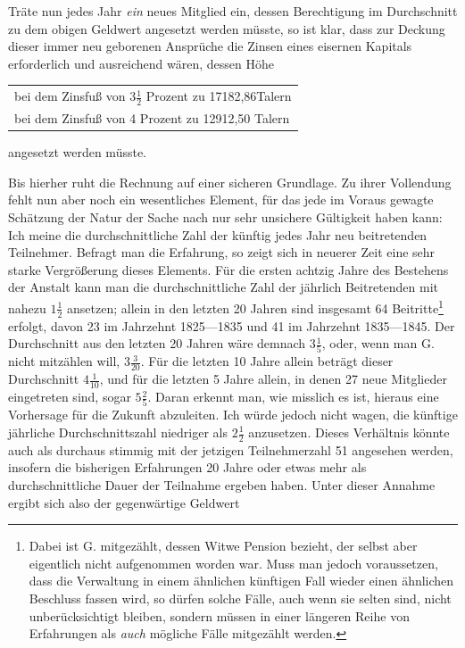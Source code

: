 Träte nun jedes Jahr \textit{ein} neues Mitglied ein, dessen Berechtigung im Durchschnitt zu dem obigen Geldwert angesetzt werden müsste, so ist klar, dass zur Deckung dieser immer neu geborenen Ansprüche die Zinsen eines eisernen Kapitals erforderlich und ausreichend wären, dessen Höhe
\begin{center}
\begin{tabular}{l}
bei dem Zinsfuß von \(3\tfrac{1}{2}\) Prozent zu 17182,86Talern\\
bei dem Zinsfuß von 4 Prozent zu 12912,50 Talern
\end{tabular}
\end{center}
\noindent angesetzt werden müsste.

Bis hierher ruht die Rechnung auf einer sicheren Grundlage. Zu ihrer Vollendung fehlt nun aber noch ein wesentliches Element, für das jede im Voraus gewagte Schätzung der Natur der Sache nach nur sehr unsichere Gültigkeit haben kann: Ich meine die durchschnittliche Zahl der künftig jedes Jahr neu beitretenden Teilnehmer. Befragt man die Erfahrung, so zeigt sich in neuerer Zeit eine sehr starke Vergrößerung dieses Elements. Für die ersten achtzig Jahre des Bestehens der Anstalt kann man die durchschnittliche Zahl der jährlich Beitretenden mit nahezu \(1\tfrac{1}{2}\) ansetzen; allein in den letzten 20 Jahren sind insgesamt 64 Beitritte\footnote{Dabei ist G. mitgezählt, dessen Witwe Pension bezieht, der selbst aber eigentlich nicht aufgenommen worden war. Muss man jedoch voraussetzen, dass die Verwaltung in einem ähnlichen künftigen Fall wieder einen ähnlichen Beschluss fassen wird, so dürfen solche Fälle, auch wenn sie selten sind, nicht unberücksichtigt bleiben, sondern müssen in einer längeren Reihe von Erfahrungen als \textit{auch} mögliche Fälle mitgezählt werden.} erfolgt, davon 23 im Jahrzehnt 1825—1835 und 41 im Jahrzehnt 1835—1845. Der Durchschnitt aus den letzten 20 Jahren wäre demnach \(3\tfrac{1}{5}\), oder, wenn man G. nicht mitzählen will, \(3\tfrac{3}{20}\). Für die letzten 10 Jahre allein beträgt dieser Durchschnitt \(4\tfrac{1}{10}\), und für die letzten 5 Jahre allein, in denen 27 neue Mitglieder eingetreten sind, sogar \(5\tfrac{2}{5}\). Daran erkennt man, wie misslich es ist, hieraus eine Vorhersage für die Zukunft abzuleiten. Ich würde jedoch nicht wagen, die künftige jährliche Durchschnittszahl niedriger als \(2\tfrac{1}{2}\) anzusetzen. Dieses Verhältnis könnte auch als durchaus stimmig mit der jetzigen Teilnehmerzahl 51 angesehen werden, insofern die bisherigen Erfahrungen 20 Jahre oder etwas mehr als durchschnittliche Dauer der Teilnahme ergeben haben. Unter dieser Annahme ergibt sich also der gegenwärtige Geldwert
